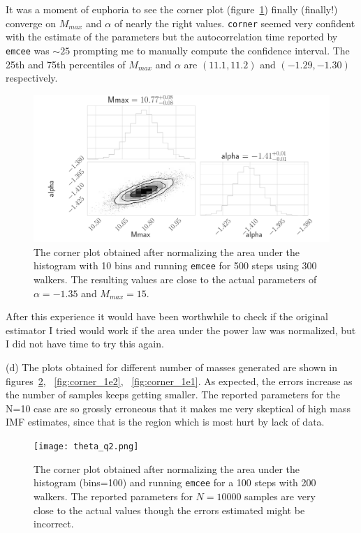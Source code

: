 \documentclass[12pt,usletter,english]{article}
\begin{document}
It was a moment of euphoria to see the corner plot
(figure~\ref{fig:corner_1e3}) finally (finally!)  converge on
$M_{max}$ and $\alpha$ of nearly the right values. \texttt{corner}
seemed very confident with the estimate of the parameters but the
autocorrelation time reported by \texttt{emcee} was $\sim 25$
prompting me to manually compute the confidence interval. The 25th and
75th percentiles of $M_{max}$ and $\alpha$ are $(11.1,11.2)$ and
$(-1.29,-1.30)$ respectively. 

\begin{figure}[!h]
  \centering \includegraphics[width=13cm]{theta_1e3.png}
  \caption{The corner plot obtained after normalizing the area under
    the histogram with 10 bins and running \texttt{emcee} for 500
    steps using 300 walkers. The resulting values are close to the
    actual parameters of $\alpha = -1.35$ and $M_{max}=15$.
    \label{fig:corner_1e3}}
\end{figure}

After this experience it would have been worthwhile to check if the
original estimator I tried would work if the area under the power law
was normalized, but I did not have time to try this again.

(d) The plots obtained for different number of masses generated are
shown in figures~\ref{fig:corner_1e4}, ~\ref{fig:corner_1e2},
~\ref{fig:corner_1e1}. As expected, the errors increase as the number
of samples keeps getting smaller. The reported parameters for the N=10
case are so grossly erroneous that it makes me very skeptical of high
mass IMF estimates, since that is the region which is most hurt by
lack of data.

\begin{figure}[!h]
  \centering \texttt{[image: theta\_q2.png]}
  \caption{The corner plot obtained after normalizing the area under
    the histogram (bins=100) and running \texttt{emcee} for a 100
    steps with 200 walkers. The reported parameters for $N=10000$
    samples are very close to the actual values though the errors
    estimated might be incorrect.
    \label{fig:corner_1e4}}
\end{figure}
\end{document}
